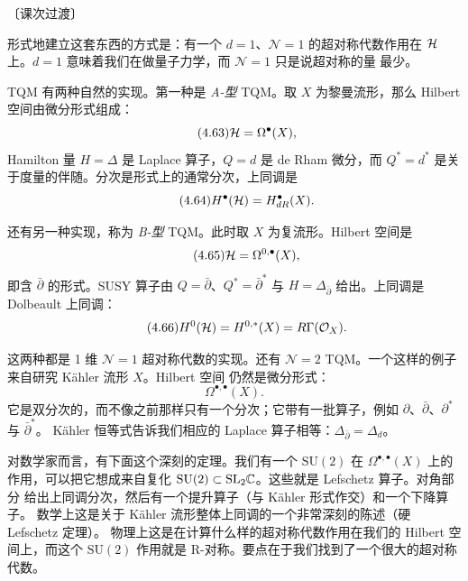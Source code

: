 \begin{flushright}\small 〔课次过渡〕\end{flushright}

形式地建立这套东西的方式是：有一个 $d=1$、$\mathcal{N}=1$ 的超对称代数作用在
$\mathcal{H}$ 上。$d=1$ 意味着我们在做量子力学，而 $\mathcal{N}=1$ 只是说超对称的量
最少。

TQM 有两种自然的实现。第一种是 \emph{A-型} TQM。取 $X$ 为黎曼流形，那么
Hilbert 空间由微分形式组成：
\begin{equation}\tag{4.63}
\mathcal{H}=\Omega^{\bullet}(X),
\end{equation}
Hamilton 量 $H=\Delta$ 是 Laplace 算子，$Q=d$ 是 de Rham 微分，而
$Q^{*}=d^{*}$ 是关于度量的伴随。分次是形式上的通常分次，上同调是
\begin{equation}\tag{4.64}
H^{\bullet}(\mathcal{H})=H^{\bullet}_{dR}(X).
\end{equation}

还有另一种实现，称为 \emph{B-型} TQM。此时取 $X$ 为复流形。Hilbert 空间是
\begin{equation}\tag{4.65}
\mathcal{H}=\Omega^{0,\bullet}(X),
\end{equation}
即含 $\bar\partial$ 的形式。SUSY 算子由 $Q=\bar\partial$、$Q^{*}=\bar\partial^{*}$
与 $H=\Delta_{\bar\partial}$ 给出。上同调是 Dolbeault 上同调：
\begin{equation}\tag{4.66}
H^{0}(\mathcal{H})=H^{0,*}(X)=R\Gamma(\mathcal{O}_{X}).
\end{equation}

这两种都是 1 维 $\mathcal{N}=1$ 超对称代数的实现。还有
$\mathcal{N}=2$ TQM。一个这样的例子来自研究 Kähler 流形 $X$。Hilbert 空间
仍然是微分形式：
\begin{equation}\tag{4.67}
\Omega^{\bullet,\bullet}(X).
\end{equation}
它是双分次的，而不像之前那样只有一个分次；它带有一批算子，例如
$\partial$、$\bar\partial$、$\partial^{*}$ 与 $\bar\partial^{*}$。
Kähler 恒等式告诉我们相应的 Laplace 算子相等：$\Delta_{\bar\partial}=\Delta_{d}$。

对数学家而言，有下面这个深刻的定理。我们有一个 $\mathrm{SU}(2)$ 在
$\Omega^{\bullet,\bullet}(X)$ 上的作用，可以把它想成来自复化
$\mathrm{SU}(2)\subset \mathrm{SL}_{2}\mathbb{C}$。这些就是 Lefschetz 算子。对角部分
给出上同调分次，然后有一个提升算子（与 Kähler 形式作交）和一个下降算子。
数学上这是关于 Kähler 流形整体上同调的一个非常深刻的陈述（硬 Lefschetz 定理）。
物理上这是在计算什么样的超对称代数作用在我们的 Hilbert 空间上，而这个
$\mathrm{SU}(2)$ 作用就是 R-对称。要点在于我们找到了一个很大的超对称代数。


